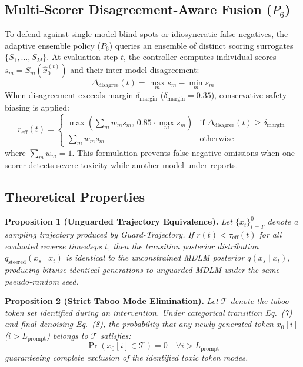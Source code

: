 \documentclass[conference]{IEEEtran}
\begin{document}
\subsection{Multi-Scorer Disagreement-Aware Fusion ($P_6$)}
To defend against single-model blind spots or idiosyncratic false negatives, the adaptive ensemble policy ($P_6$) queries an ensemble of distinct scoring surrogates $\{S_1, \dots, S_M\}$. At evaluation step $t$, the controller computes individual scores $s_m = S_m(\hat{x}_0^{(t)})$ and their inter-model disagreement:
\begin{equation}
\Delta_{\text{disagree}}(t) = \max_{m} s_m - \min_{m} s_m
\end{equation}
When disagreement exceeds margin $\delta_{\text{margin}}$ ($\delta_{\text{margin}} = 0.35$), conservative safety biasing is applied:
\begin{equation}
r_{\text{eff}}(t) = \begin{cases}
\max\left( \sum_{m} w_m s_m, \, 0.85 \cdot \max_{m} s_m \right) & \text{if } \Delta_{\text{disagree}}(t) \ge \delta_{\text{margin}} \\
\sum_{m} w_m s_m & \text{otherwise}
\end{cases}
\end{equation}
where $\sum_m w_m = 1$. This formulation prevents false-negative omissions when one scorer detects severe toxicity while another model under-reports.

\subsection{Theoretical Properties}
\noindent\textbf{Proposition 1 (Unguarded Trajectory Equivalence).}
\textit{Let $\{x_t\}_{t=T}^0$ denote a sampling trajectory produced by Guard-Trajectory. If $r(t) < \tau_{\text{eff}}(t)$ for all evaluated reverse timesteps $t$, then the transition posterior distribution $q_{\text{steered}}(x_s \mid x_t)$ is identical to the unconstrained MDLM posterior $q(x_s \mid x_t)$, producing bitwise-identical generations to unguarded MDLM under the same pseudo-random seed.}

\noindent\textbf{Proposition 2 (Strict Taboo Mode Elimination).}
\textit{Let $\mathcal{T}$ denote the taboo token set identified during an intervention. Under categorical transition Eq.~(7) and final denoising Eq.~(8), the probability that any newly generated token $x_0[i]$ ($i > L_{\text{prompt}}$) belongs to $\mathcal{T}$ satisfies:
\begin{equation}
\Pr(x_0[i] \in \mathcal{T}) = 0 \quad \forall i > L_{\text{prompt}}
\end{equation}
guaranteeing complete exclusion of the identified toxic token modes.}
\end{document}
